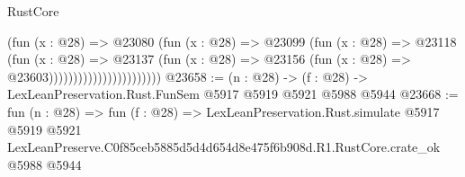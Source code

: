 \begin{lexlean}{RustCore}
\begin{coremodule}
                                      (fun (x : @28) =>
                                      @23080
                                        (fun (x : @28) =>
                                        @23099
                                          (fun (x : @28) =>
                                          @23118
                                            (fun (x : @28) =>
                                            @23137
                                              (fun (x : @28) =>
                                              @23156 (fun (x : @28) => @23603)))))))))))))))))))))))
@23658 := (n : @28) -> (f : @28) -> LexLeanPreservation.Rust.FunSem @5917 @5919 @5921 @5988 @5944
@23668 := fun (n : @28) =>
  fun (f : @28) =>
  LexLeanPreservation.Rust.simulate
    @5917
    @5919
    @5921
    LexLeanPreserve.C0f85ceb5885d5d4d654d8e475f6b908d.R1.RustCore.crate_ok
    @5988
    @5944
\end{coremodule}
\end{lexlean}
